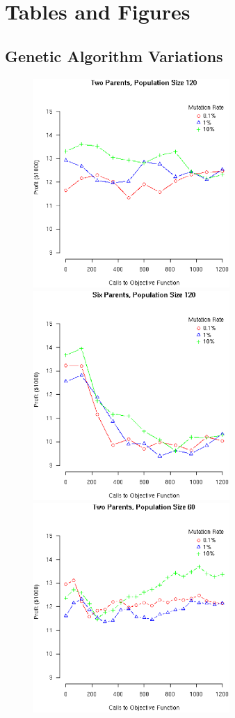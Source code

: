 \documentclass[12pt]{article}
\begin{document}
\pagebreak
\section{Tables and Figures}

\subsection{Genetic Algorithm Variations}

\begin{figure}[!ht]
  \begin{minipage}[b]{0.5\linewidth}
    \includegraphics[width=7.5cm]{Gen2ParentsPop120.eps}
  \end{minipage}
  \begin{minipage}[b]{0.5\linewidth}
    \includegraphics[width=7.5cm]{Gen6ParentsPop120.eps}
  \end{minipage}
  \begin{minipage}[b]{0.5\linewidth}
    \includegraphics[width=7.5cm]{Gen2ParentsPop60.eps}

\end{minipage}
\end{figure}
\end{document}
